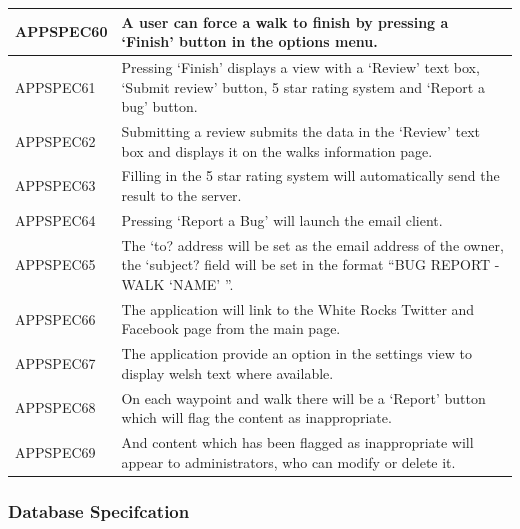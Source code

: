 \documentclass[11pt,a4paper]{article}
\begin{document}
\begin{longtable}{|p{2.5cm}p{13cm}|}
APPSPEC60 & A user can force a walk to finish by pressing a `Finish' button in the options menu. \\ \hline
APPSPEC61 & Pressing `Finish' displays a view with a `Review' text box, `Submit review' button, 5 star rating system and `Report a bug' button. \\ \hline
APPSPEC62 & Submitting a review submits the data in the `Review' text box and displays it on the walks information page.\\ \hline
APPSPEC63 & Filling in the 5 star rating system will automatically send the result to the server.\\ \hline
APPSPEC64 & Pressing `Report a Bug' will launch the email client. \\ \hline
APPSPEC65 & The `to? address will be set as the email address of the owner, the `subject? field will be set in the format ``BUG REPORT - WALK `NAME' ''.\\ \hline
APPSPEC66 & The application will link to the White Rocks Twitter and Facebook page from the main page.\\ \hline
APPSPEC67 & The application provide an option in the settings view to display welsh text where available. \\ \hline
APPSPEC68 & On each waypoint and walk there will be a `Report' button which will flag the content as inappropriate. \\ \hline
APPSPEC69 & And content which has been flagged as inappropriate will appear to administrators, who can modify or delete it. \\ \hline
\end{longtable}

\subsubsection{Database Specifcation}
\end{document}

